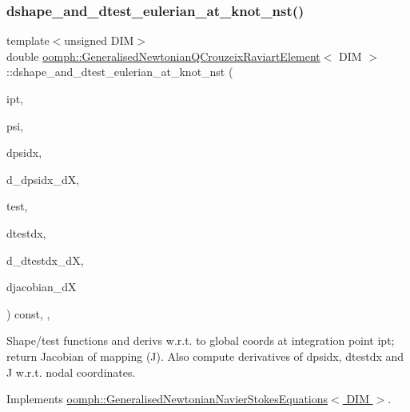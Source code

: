 \subsubsection{\texorpdfstring{dshape\+\_\+and\+\_\+dtest\+\_\+eulerian\+\_\+at\+\_\+knot\+\_\+nst()}{dshape\_and\_dtest\_eulerian\_at\_knot\_nst()}\hspace{0.1cm}{\footnotesize\ttfamily [2/4]}}
{\footnotesize\ttfamily template$<$unsigned D\+IM$>$ \\
double \hyperlink{classoomph_1_1GeneralisedNewtonianQCrouzeixRaviartElement}{oomph\+::\+Generalised\+Newtonian\+Q\+Crouzeix\+Raviart\+Element}$<$ D\+IM $>$\+::dshape\+\_\+and\+\_\+dtest\+\_\+eulerian\+\_\+at\+\_\+knot\+\_\+nst (\begin{DoxyParamCaption}\item[{const unsigned \&}]{ipt,  }\item[{\hyperlink{classoomph_1_1Shape}{Shape} \&}]{psi,  }\item[{\hyperlink{classoomph_1_1DShape}{D\+Shape} \&}]{dpsidx,  }\item[{\hyperlink{classoomph_1_1RankFourTensor}{Rank\+Four\+Tensor}$<$ double $>$ \&}]{d\+\_\+dpsidx\+\_\+dX,  }\item[{\hyperlink{classoomph_1_1Shape}{Shape} \&}]{test,  }\item[{\hyperlink{classoomph_1_1DShape}{D\+Shape} \&}]{dtestdx,  }\item[{\hyperlink{classoomph_1_1RankFourTensor}{Rank\+Four\+Tensor}$<$ double $>$ \&}]{d\+\_\+dtestdx\+\_\+dX,  }\item[{\hyperlink{classoomph_1_1DenseMatrix}{Dense\+Matrix}$<$ double $>$ \&}]{djacobian\+\_\+dX }\end{DoxyParamCaption}) const\hspace{0.3cm}{\ttfamily [inline]}, {\ttfamily [protected]}, {\ttfamily [virtual]}}



Shape/test functions and derivs w.\+r.\+t. to global coords at integration point ipt; return Jacobian of mapping (J). Also compute derivatives of dpsidx, dtestdx and J w.\+r.\+t. nodal coordinates. 



Implements \hyperlink{classoomph_1_1GeneralisedNewtonianNavierStokesEquations_a24a93b73dba66e04eabb9b37a9360daa}{oomph\+::\+Generalised\+Newtonian\+Navier\+Stokes\+Equations$<$ D\+I\+M $>$}.

\mbox{\label{classoomph_1_1GeneralisedNewtonianQCrouzeixRaviartElement_adf5aa1d104a3b3095e69a5f698372a04}} 
